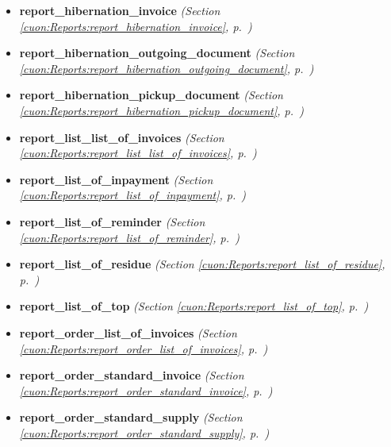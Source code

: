 \begin{itemize}
\item \textbf{report\_hibernation\_invoice}
  \textit{(Section \ref{cuon:Reports:report_hibernation_invoice}, p.~\pageref{cuon:Reports:report_hibernation_invoice})}

\item \textbf{report\_hibernation\_outgoing\_document}
  \textit{(Section \ref{cuon:Reports:report_hibernation_outgoing_document}, p.~\pageref{cuon:Reports:report_hibernation_outgoing_document})}

\item \textbf{report\_hibernation\_pickup\_document}
  \textit{(Section \ref{cuon:Reports:report_hibernation_pickup_document}, p.~\pageref{cuon:Reports:report_hibernation_pickup_document})}

\item \textbf{report\_list\_list\_of\_invoices}
  \textit{(Section \ref{cuon:Reports:report_list_list_of_invoices}, p.~\pageref{cuon:Reports:report_list_list_of_invoices})}

\item \textbf{report\_list\_of\_inpayment}
  \textit{(Section \ref{cuon:Reports:report_list_of_inpayment}, p.~\pageref{cuon:Reports:report_list_of_inpayment})}

\item \textbf{report\_list\_of\_reminder}
  \textit{(Section \ref{cuon:Reports:report_list_of_reminder}, p.~\pageref{cuon:Reports:report_list_of_reminder})}

\item \textbf{report\_list\_of\_residue}
  \textit{(Section \ref{cuon:Reports:report_list_of_residue}, p.~\pageref{cuon:Reports:report_list_of_residue})}

\item \textbf{report\_list\_of\_top}
  \textit{(Section \ref{cuon:Reports:report_list_of_top}, p.~\pageref{cuon:Reports:report_list_of_top})}

\item \textbf{report\_order\_list\_of\_invoices}
  \textit{(Section \ref{cuon:Reports:report_order_list_of_invoices}, p.~\pageref{cuon:Reports:report_order_list_of_invoices})}

\item \textbf{report\_order\_standard\_invoice}
  \textit{(Section \ref{cuon:Reports:report_order_standard_invoice}, p.~\pageref{cuon:Reports:report_order_standard_invoice})}

\item \textbf{report\_order\_standard\_supply}
  \textit{(Section \ref{cuon:Reports:report_order_standard_supply}, p.~\pageref{cuon:Reports:report_order_standard_supply})}


\end{itemize}

